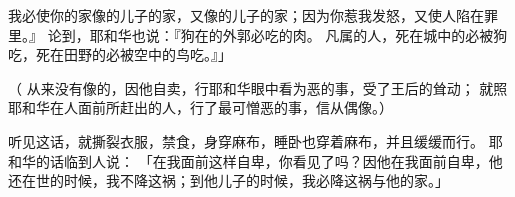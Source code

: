 {我必使你的家像{}的儿子{}的家，又像{}的儿子{}的家；因为你惹我发怒，又使{}人陷在罪里。』
论到{}，耶和华也说：『狗在{}的外郭必吃{}的肉。
凡属{}的人，死在城中的必被狗吃，死在田野的必被空中的鸟吃。』」
\par }{\PP （
从来没有像{}的，因他自卖，行耶和华眼中看为恶的事，受了王后{}的耸动；
就照耶和华在{}人面前所赶出的{}人，行了最可憎恶的事，信从偶像。）
\par }{\PP {}听见这话，就撕裂衣服，禁食，身穿麻布，睡卧也穿着麻布，并且缓缓而行。
耶和华的话临到{}人{}说：
「{}在我面前这样自卑，你看见了吗？因他在我面前自卑，他还在世的时候，我不降这祸；到他儿子的时候，我必降这祸与他的家。」

}
